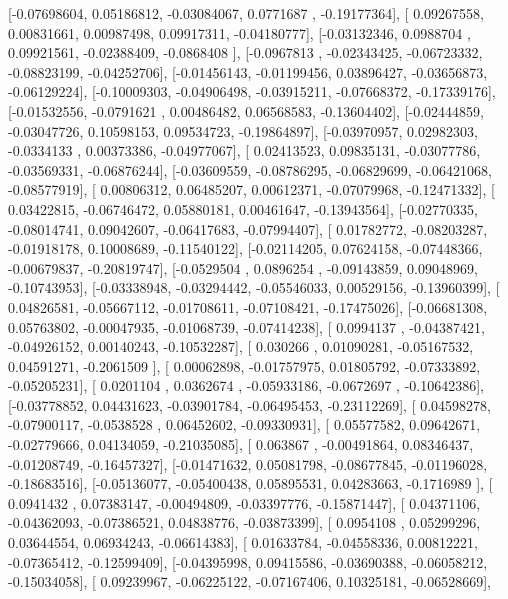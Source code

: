 \documentclass{article}
\begin{document}
       [-0.07698604,  0.05186812, -0.03084067,  0.0771687 , -0.19177364],
       [ 0.09267558,  0.00831661,  0.00987498,  0.09917311, -0.04180777],
       [-0.03132346,  0.0988704 ,  0.09921561, -0.02388409, -0.0868408 ],
       [-0.0967813 , -0.02343425, -0.06723332, -0.08823199, -0.04252706],
       [-0.01456143, -0.01199456,  0.03896427, -0.03656873, -0.06129224],
       [-0.10009303, -0.04906498, -0.03915211, -0.07668372, -0.17339176],
       [-0.01532556, -0.0791621 ,  0.00486482,  0.06568583, -0.13604402],
       [-0.02444859, -0.03047726,  0.10598153,  0.09534723, -0.19864897],
       [-0.03970957,  0.02982303, -0.0334133 ,  0.00373386, -0.04977067],
       [ 0.02413523,  0.09835131, -0.03077786, -0.03569331, -0.06876244],
       [-0.03609559, -0.08786295, -0.06829699, -0.06421068, -0.08577919],
       [ 0.00806312,  0.06485207,  0.00612371, -0.07079968, -0.12471332],
       [ 0.03422815, -0.06746472,  0.05880181,  0.00461647, -0.13943564],
       [-0.02770335, -0.08014741,  0.09042607, -0.06417683, -0.07994407],
       [ 0.01782772, -0.08203287, -0.01918178,  0.10008689, -0.11540122],
       [-0.02114205,  0.07624158, -0.07448366, -0.00679837, -0.20819747],
       [-0.0529504 ,  0.0896254 , -0.09143859,  0.09048969, -0.10743953],
       [-0.03338948, -0.03294442, -0.05546033,  0.00529156, -0.13960399],
       [ 0.04826581, -0.05667112, -0.01708611, -0.07108421, -0.17475026],
       [-0.06681308,  0.05763802, -0.00047935, -0.01068739, -0.07414238],
       [ 0.0994137 , -0.04387421, -0.04926152,  0.00140243, -0.10532287],
       [ 0.030266  ,  0.01090281, -0.05167532,  0.04591271, -0.2061509 ],
       [ 0.00062898, -0.01757975,  0.01805792, -0.07333892, -0.05205231],
       [ 0.0201104 ,  0.0362674 , -0.05933186, -0.0672697 , -0.10642386],
       [-0.03778852,  0.04431623, -0.03901784, -0.06495453, -0.23112269],
       [ 0.04598278, -0.07900117, -0.0538528 ,  0.06452602, -0.09330931],
       [ 0.05577582,  0.09642671, -0.02779666,  0.04134059, -0.21035085],
       [ 0.063867  , -0.00491864,  0.08346437, -0.01208749, -0.16457327],
       [-0.01471632,  0.05081798, -0.08677845, -0.01196028, -0.18683516],
       [-0.05136077, -0.05400438,  0.05895531,  0.04283663, -0.1716989 ],
       [ 0.0941432 ,  0.07383147, -0.00494809, -0.03397776, -0.15871447],
       [ 0.04371106, -0.04362093, -0.07386521,  0.04838776, -0.03873399],
       [ 0.0954108 ,  0.05299296,  0.03644554,  0.06934243, -0.06614383],
       [ 0.01633784, -0.04558336,  0.00812221, -0.07365412, -0.12599409],
       [-0.04395998,  0.09415586, -0.03690388, -0.06058212, -0.15034058],
       [ 0.09239967, -0.06225122, -0.07167406,  0.10325181, -0.06528669],
\end{document}
